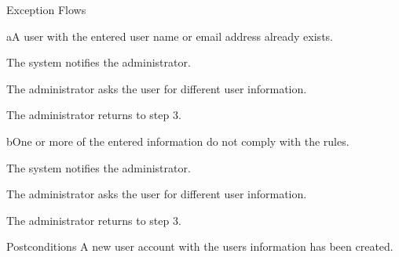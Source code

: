 %
\begin{cpartList}{Exception Flows}
  \begin{innerList}{4}{a}{A user with the entered user name or email address already exists.}
    \item The system notifies the administrator.
    \item The administrator asks the user for different user information.
    \item The administrator returns to step 3.
  \end{innerList}

  \begin{innerList}{4}{b}{One or more of the entered information do not comply with the rules.}
    \item The system notifies the administrator.
    \item The administrator asks the user for different user information.
    \item The administrator returns to step 3.
  \end{innerList}
\end{cpartList}

%
\begin{cpart}{Postconditions}
A new user account with the users information has been created.
\end{cpart}

\clearpage
